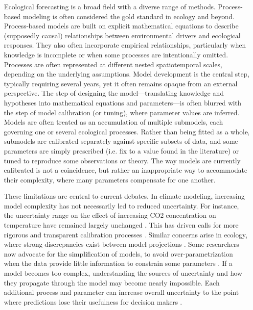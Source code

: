 \documentclass[11pt]{article}
\begin{document}
Ecological forecasting is a broad field with a diverse range of methods. Process-based modeling is often considered the gold standard in ecology \citep{Urban2016, Pilowsky2022} and beyond. Process-based models are built on explicit mathematical equations to describe (supposedly causal) relationships between environmental drivers and ecological responses. They also often incorporate empirical relationships, particularly when knowledge is incomplete or when some processes are intentionally omitted. Processes are often represented at different nested spatiotemporal scales, depending on the underlying assumptions. Model development is the central step, typically requiring several years, yet it often remains opaque from an external perspective. The step of designing the model---translating knowledge and hypotheses into mathematical equations and parameters---is often blurred with the step of model calibration (or tuning), where parameter values are inferred. Models are often treated as an accumulation of multiple submodels, each governing one or several ecological processes. Rather than being fitted as a whole, submodels are calibrated separately against specific subsets of data, and some parameters are simply prescribed (i.e. fix to a value found in the literature) or tuned to reproduce some observations or theory. The way models are currently calibrated is not a coincidence, %
but rather an inappropriate way to accommodate their complexity, where many parameters compensate for one another.

These limitations are central to current debates. In climate modeling, increasing model complexity has not necessarily led to reduced uncertainty. For instance, the uncertainty range on the effect of increasing CO2 concentration on temperature have remained largely unchanged \citep{Zelinka2020}. This has driven calls for more rigorous and transparent calibration processes \citep{balaji2022general}. Similar concerns arise in ecology, where strong discrepancies exist between model projections \citep{Cheaib2012}. Some researchers now advocate for the simplification of models, to avoid over-parametrization when the data provide little information to constrain some parameters \citep{Wang2017, Harrison2021}. If a model becomes too complex, understanding the sources of uncertainty and how they propagate through the model may become nearly impossible.
Each additional process and parameter can increase overall uncertainty to the point where predictions lose their usefulness for decision makers \citep{Saltelli2020}.
\end{document}
